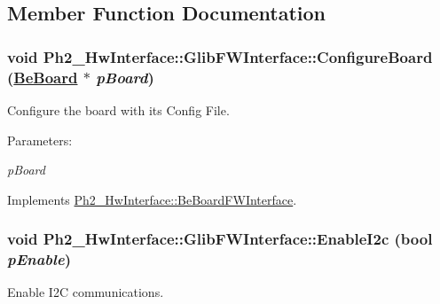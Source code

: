 \subsection{Member Function Documentation}
\hypertarget{class_ph2___hw_interface_1_1_glib_f_w_interface_52658cd813658d4fae48a79bdabaa5cc}{
\subsubsection[ConfigureBoard]{\setlength{\rightskip}{0pt plus 5cm}void Ph2\_\-Hw\-Interface::Glib\-FWInterface::Configure\-Board (\hyperlink{class_ph2___hw_description_1_1_be_board}{Be\-Board} $\ast$ {\em p\-Board})}}
\label{class_ph2___hw_interface_1_1_glib_f_w_interface_52658cd813658d4fae48a79bdabaa5cc}


Configure the board with its Config File. 

\begin{Desc}
\item[Parameters:]
\begin{description}
\item[{\em p\-Board}]\end{description}
\end{Desc}


Implements \hyperlink{class_ph2___hw_interface_1_1_be_board_f_w_interface_b8836074e2dc8f3afb211479119390fc}{Ph2\_\-Hw\-Interface::Be\-Board\-FWInterface}.\hypertarget{class_ph2___hw_interface_1_1_glib_f_w_interface_bb8f5593c61f54a35a2a7f99b3d6ca55}{
\subsubsection[EnableI2c]{\setlength{\rightskip}{0pt plus 5cm}void Ph2\_\-Hw\-Interface::Glib\-FWInterface::Enable\-I2c (bool {\em p\-Enable})}}
\label{class_ph2___hw_interface_1_1_glib_f_w_interface_bb8f5593c61f54a35a2a7f99b3d6ca55}


Enable I2C communications. 

